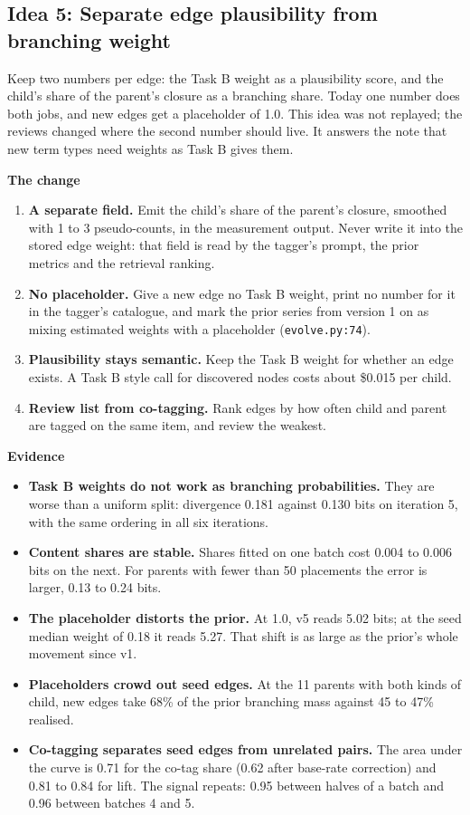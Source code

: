 \documentclass[10pt,a4paper]{article}
\newcommand{\code}[1]{\texttt{#1}}
\newcommand{\lab}[1]{\par\vspace{0.35em}\textbf{#1}\par\nobreak}
\begin{document}
\subsection{Idea 5: Separate edge plausibility from branching weight}

Keep two numbers per edge: the Task B weight as a plausibility score, and the child's share of the parent's
closure as a branching share. Today one number does both jobs, and new edges get a placeholder of 1.0. This
idea was not replayed; the reviews changed where the second number should live. It answers the note that
new term types need weights as Task B gives them.

\lab{The change}
\begin{enumerate}
\item \textbf{A separate field.} Emit the child's share of the parent's closure, smoothed with 1 to 3 pseudo-counts, in the measurement output. Never write it into the stored edge weight: that field is read by the tagger's prompt, the prior metrics and the retrieval ranking.
\item \textbf{No placeholder.} Give a new edge no Task B weight, print no number for it in the tagger's catalogue, and mark the prior series from version 1 on as mixing estimated weights with a placeholder (\code{evolve.py:74}).
\item \textbf{Plausibility stays semantic.} Keep the Task B weight for whether an edge exists. A Task B style call for discovered nodes costs about \$0.015 per child.
\item \textbf{Review list from co-tagging.} Rank edges by how often child and parent are tagged on the same item, and review the weakest.
\end{enumerate}

\lab{Evidence}
\begin{itemize}
\item \textbf{Task B weights do not work as branching probabilities.} They are worse than a uniform split: divergence 0.181 against 0.130 bits on iteration 5, with the same ordering in all six iterations.
\item \textbf{Content shares are stable.} Shares fitted on one batch cost 0.004 to 0.006 bits on the next. For parents with fewer than 50 placements the error is larger, 0.13 to 0.24 bits.
\item \textbf{The placeholder distorts the prior.} At 1.0, v5 reads 5.02 bits; at the seed median weight of 0.18 it reads 5.27. That shift is as large as the prior's whole movement since v1.
\item \textbf{Placeholders crowd out seed edges.} At the 11 parents with both kinds of child, new edges take 68\% of the prior branching mass against 45 to 47\% realised.
\item \textbf{Co-tagging separates seed edges from unrelated pairs.} The area under the curve is 0.71 for the co-tag share (0.62 after base-rate correction) and 0.81 to 0.84 for lift. The signal repeats: 0.95 between halves of a batch and 0.96 between batches 4 and 5.
\end{itemize}
\end{document}
